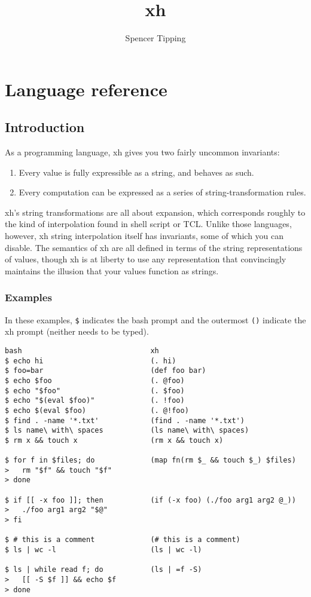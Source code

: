 \documentclass{report}
\title{xh}
\author{Spencer Tipping}
\begin{document}
\maketitle{}
\tableofcontents{}


\part{Language reference}\label{part:language-reference}
\chapter{Introduction}\label{chp:introduction}
  As a programming language, xh gives you two fairly uncommon invariants:

\begin{enumerate}
\item{Every value is fully expressible as a string, and behaves as such.}
       \label{item:values-are-strings}
\item{Every computation can be expressed as a series of}
       string-transformation rules.
       \label{item:computation-is-transformation}
\end{enumerate}

  xh's string transformations are all about expansion, which corresponds
  roughly to the kind of interpolation found in shell script or TCL. Unlike
  those languages, however, xh string interpolation itself has invariants, some
  of which you can disable. The semantics of xh are all defined in terms of the
  string representations of values, though xh is at liberty to use any
  representation that convincingly maintains the illusion that your values
  function as strings.

\section{Examples}\label{sec:examples}
    In these examples, \verb|$| indicates the bash prompt and the outermost
    \verb|()| indicate the xh prompt (neither needs to be typed).

\begin{verbatim}
bash                              xh
$ echo hi                         (. hi)
$ foo=bar                         (def foo bar)
$ echo $foo                       (. @foo)
$ echo "$foo"                     (. $foo)
$ echo "$(eval $foo)"             (. !foo)
$ echo $(eval $foo)               (. @!foo)
$ find . -name '*.txt'            (find . -name '*.txt')
$ ls name\ with\ spaces           (ls name\ with\ spaces)
$ rm x && touch x                 (rm x && touch x)

$ for f in $files; do             (map fn(rm $_ && touch $_) $files)
>   rm "$f" && touch "$f"
> done

$ if [[ -x foo ]]; then           (if (-x foo) (./foo arg1 arg2 @_))
>   ./foo arg1 arg2 "$@"
> fi

$ # this is a comment             (# this is a comment)
$ ls | wc -l                      (ls | wc -l)

$ ls | while read f; do           (ls | =f -S)
>   [[ -S $f ]] && echo $f
> done
\end{verbatim}
\end{document}
